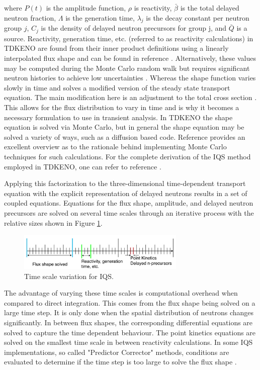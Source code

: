 \documentclass{anstrans}
\begin{document}
where $P(t)$ is the amplitude function, $\rho$ is reactivity, $\bar{\beta}$ is the total delayed neutron fraction, $\Lambda$ is the generation time, $\lambda_j$ is the decay constant per neutron group $j$, $C_j$ is the density of delayed neutron precursors for group j, and $\bar{Q}$ is a source.  
 Reactivity, generation time, etc. (referred to as reactivity calculations) in TDKENO are found from their inner product definitions using a linearly interpolated flux shape and can be found in reference \cite{Bentley}.  Alternatively, these values may be computed during the Monte Carlo random walk but requires significant neutron histories to achieve low uncertainties \cite{Waddell}.  Whereas the shape function varies slowly in time and solves a modified version of the steady state transport equation.  The main modification here is an adjustment to the total cross section \cite{Bentley}\cite{Gehin}.  This allows for the flux distribution to vary in time and is why it becomes a necessary formulation to use in transient analysis.  In TDKENO the shape equation is solved via Monte Carlo, but in general the shape equation may be solved a variety of ways, such as a diffusion based code.  Reference \cite{Shayesteh} provides an excellent overview as to the rationale behind implementing Monte Carlo techniques for such calculations.  For the complete derivation of the IQS method employed in TDKENO, one can refer to reference \cite{Bentley}. 

Applying this factorization to the three-dimensional time-dependent transport equation with the explicit representation of delayed neutrons results in a set of coupled equations.  Equations for the flux shape, amplitude, and delayed neutron precursors are solved on several time scales through an iterative process with the relative sizes shown in Figure \ref{fig:time_scale}. 

\begin{figure}[h]
    \centering
    \includegraphics[width=8cm]{figures/time_scale.pdf}
    \caption{Time scale variation for IQS.}
    \label{fig:time_scale}
\end{figure}

The advantage of varying these time scales is computational overhead when compared to direct integration.  This comes from the flux shape being solved on a large time step. It is only done when the spatial distribution of neutrons changes significantly.  In between flux shapes, the corresponding differential equations are solved to capture the time dependent behaviour. The point kinetics equations are solved on the smallest time scale in between reactivity calculations.  In some IQS implementations, so called "Predictor Corrector" methods, conditions are evaluated to determine if the time step is too large to solve the flux shape \cite{Dulla}.  
\end{document}
